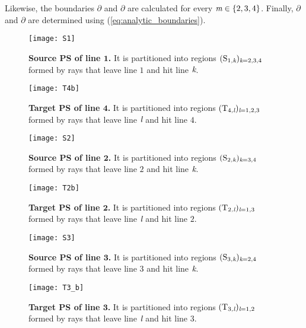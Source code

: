  Likewise, the boundaries $\partial$ and
 $\partial$ are calculated for every $\textit{m}\in\{2,3,4\}$. Finally, $\partial$ and $\partial$ are determined using (\ref{eq:analytic_boundaries}). \\
 \begin{figure}
 \begin{minipage}[]{.43\textwidth}
   \texttt{[image: S1]}
\caption{\footnotesize{\textbf{Source PS of line $\boldsymbol{1}$.} It is partitioned into regions $(\mbox{$\textup{S}_{\textit{$1$,\textit{k}}}$})_{\textit{\textit{k}} = 2,3,4}$
   formed by rays that leave line $1$ and hit line $\textit{\textit{k}}$.}}
   \label{fig:S1}
 \end{minipage}
  \begin{minipage}[]{.45\textwidth}
  \centering
   \texttt{[image: T4b]}
   \caption{\footnotesize{\textbf{Target PS of line $\boldsymbol{4}$.} It is partitioned into regions $(\mbox{$\textup{T}_{\textit{$4$,\textit{l}}}$})_{\textit{\textit{l}} = 1,2,3}$
   formed by rays that leave line $\textit{\textit{l}}$ and hit line $4$.}}
   \label{fig:T4b}
 \end{minipage}
\begin{minipage}[]{.43\textwidth}
\centering
   \texttt{[image: S2]}
\caption{\footnotesize{\textbf{Source PS of line $\boldsymbol{2}$.} It is partitioned into regions $(\mbox{$\textup{S}_{\textit{$2$,\textit{k}}}$})_{\textit{\textit{k}} = 3,4}$
  formed by rays that leave line $2$ and hit line $\textit{\textit{k}}$.}} 
 \end{minipage}
 \begin{minipage}[]{.43\textwidth}
 \centering
   \texttt{[image: T2b]}
\caption{\footnotesize{\textbf{Target PS of line $\boldsymbol{2}$.} It is partitioned into regions $(\mbox{$\textup{T}_{\textit{$2$,\textit{l}}}$})_{\textit{\textit{l}} = 1,3}$
formed by rays that leave line $\textit{\textit{l}}$ and hit line $2$. }} 
 \end{minipage}
 \begin{minipage}[]{.43\textwidth}
 \centering
   \texttt{[image: S3]}
   \caption{\footnotesize{\textbf{Source PS of line $\boldsymbol{3}$.} It is partitioned into regions
   $(\mbox{$\textup{S}_{\textit{$3$,\textit{k}}}$})_{\textit{\textit{k}} = 2,4}$ formed by rays that leave line $3$ and hit line $\textit{\textit{k}}$. }} 
 \end{minipage}
 \hspace{1.7cm}
 \begin{minipage}[]{.43\textwidth}
 \centering
   \texttt{[image: T3\_b]}
  \caption{\footnotesize{\textbf{Target PS of line $\boldsymbol{3}$.} It is partitioned into regions $(\mbox{$\textup{T}_{\textit{$3$,\textit{l}}}$})_{\textit{\textit{l}} = 1,2}$
   formed by rays that leave line $\textit{\textit{l}}$ and hit line $3$.}} 
\label{fig:T3}
 \end{minipage}
\end{figure}
